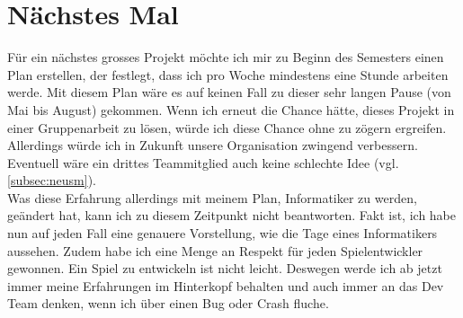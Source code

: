 \section{Nächstes Mal}
Für ein nächstes grosses Projekt möchte ich mir zu Beginn des Semesters einen Plan erstellen, der festlegt, dass ich pro Woche mindestens eine Stunde arbeiten werde. Mit diesem Plan wäre es auf keinen Fall zu dieser sehr langen
Pause (von Mai bis August) gekommen. Wenn ich erneut die Chance hätte, dieses Projekt in einer Gruppenarbeit zu lösen, würde ich diese Chance ohne zu zögern ergreifen. Allerdings würde ich in Zukunft
unsere Organisation zwingend verbessern. Eventuell wäre ein drittes Teammitglied auch keine schlechte Idee (vgl. \autoref{subsec:neusm}).\\
Was diese Erfahrung allerdings mit meinem Plan, Informatiker zu werden, geändert hat, kann ich zu diesem Zeitpunkt nicht beantworten. Fakt ist, ich habe nun auf jeden Fall eine genauere Vorstellung,
wie die Tage eines Informatikers aussehen. Zudem habe ich eine Menge an Respekt für jeden Spielentwickler gewonnen. Ein Spiel zu entwickeln ist nicht leicht. Deswegen werde ich ab jetzt immer meine Erfahrungen im Hinterkopf
behalten und auch immer an das Dev Team denken, wenn ich über einen Bug oder Crash fluche.